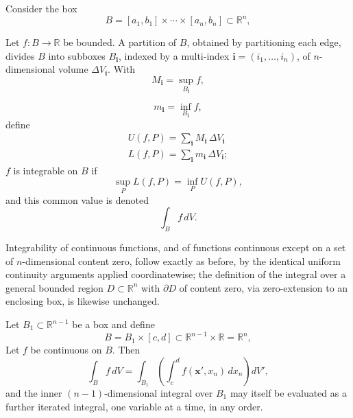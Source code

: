 \begin{definition}
Consider the box
\[
B = [a_1,b_1]\times\cdots\times[a_n,b_n] \subset \mathbb{R}^n,
\]

Let $f : B \to \mathbb{R}$ be bounded. A partition of $B$, obtained by partitioning each edge, divides $B$ into subboxes $B_{\mathbf{i}}$, indexed by a multi-index $\mathbf{i} = (i_1,\dots,i_n)$, of $n$-dimensional volume $\Delta V_{\mathbf{i}}$. With
\[
M_{\mathbf{i}} = \sup_{B_{\mathbf{i}}} f,
\]

\[
m_{\mathbf{i}} = \inf_{B_{\mathbf{i}}} f,
\]
define
\[
\begin{gathered}
U(f,P) = \sum_{\mathbf{i}} M_{\mathbf{i}}\, \Delta V_{\mathbf{i}} \\
L(f,P) = \sum_{\mathbf{i}} m_{\mathbf{i}}\, \Delta V_{\mathbf{i}};
\end{gathered}
\]
$f$ is integrable on $B$ if
\[
\sup_P L(f,P) = \inf_P U(f,P),
\]
and this common value is denoted
\[
\int_B f\, dV.
\]

\end{definition}

Integrability of continuous functions, and of functions continuous except on a set of $n$-dimensional content zero, follow exactly as before, by the identical uniform continuity arguments applied coordinatewise; the definition of the integral over a general bounded region $D \subset \mathbb{R}^n$ with $\partial D$ of content zero, via zero-extension to an enclosing box, is likewise unchanged.

\begin{theorem}
Let $B_1 \subset \mathbb{R}^{n-1}$ be a box and define
\[
B = B_1 \times [c,d] \subset \mathbb{R}^{n-1}\times\mathbb{R} = \mathbb{R}^n,
\]
Let $f$ be continuous on $B$. Then \[
\int_B f \, dV = \int_{B_1} \left( \int_c^d f(\mathbf{x}',x_n)\, dx_n \right) dV',
\] and the inner $(n-1)$-dimensional integral over $B_1$ may itself be evaluated as a further iterated integral, one variable at a time, in any order.
\end{theorem}

